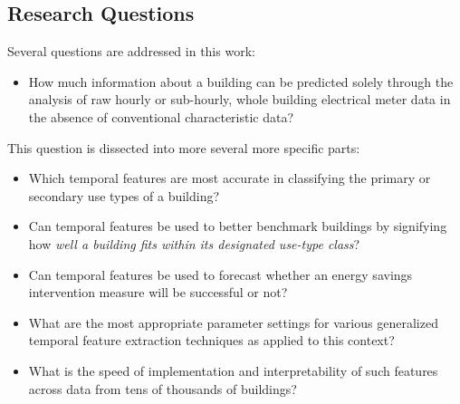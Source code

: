\subsection{Research Questions}
Several questions are addressed in this work:
\begin{itemize}
\item How much information about a building can be predicted solely through the analysis of raw hourly or sub-hourly, whole building electrical meter data in the absence of conventional characteristic data? 
\end{itemize}
This question is dissected into more several more specific parts:
\begin{itemize}
\item Which temporal features are most accurate in classifying the primary or secondary use types of a building?
\item Can temporal features be used to better benchmark buildings by signifying how \emph{well a building fits within its designated use-type class}?
\item Can temporal features be used to forecast whether an energy savings intervention measure will be successful or not?
\item What are the most appropriate parameter settings for various generalized temporal feature extraction techniques as applied to this context?
\item What is the speed of implementation and interpretability of such features across data from tens of thousands of buildings?
\end{itemize}






